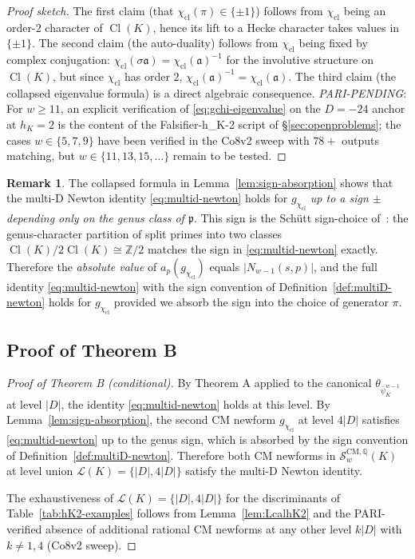\documentclass[11pt,a4paper]{amsart}
\theoremstyle{definition}
\newtheorem{remark}[theorem]{Remark}
\DeclareMathOperator{\Cl}{Cl}
\newcommand{\Q}{\mathbb{Q}}
\newcommand{\Z}{\mathbb{Z}}
\newcommand{\fp}{\mathfrak{p}}
\newcommand{\fa}{\mathfrak{a}}
\newcommand{\Lcal}{\mathcal{L}}
\newcommand{\Scal}{\mathcal{S}}
\newcommand{\hK}{h_{K}}
\begin{document}
\begin{proof}[Proof sketch]
The first claim (that $\chi_{\mathrm{cl}}(\pi) \in \{\pm 1\}$) follows from $\chi_{\mathrm{cl}}$ being an order-$2$ character of $\Cl(K)$, hence its lift to a Hecke character takes values in $\{\pm 1\}$. The second claim (the auto-duality) follows from $\chi_{\mathrm{cl}}$ being fixed by complex conjugation: $\chi_{\mathrm{cl}}(\sigma\fa) = \chi_{\mathrm{cl}}(\fa)^{-1}$ for the involutive structure on $\Cl(K)$, but since $\chi_{\mathrm{cl}}$ has order $2$, $\chi_{\mathrm{cl}}(\fa)^{-1} = \chi_{\mathrm{cl}}(\fa)$. The third claim (the collapsed eigenvalue formula) is a direct algebraic consequence. \emph{PARI-PENDING}: For $w \ge 11$, an explicit verification of \eqref{eq:gchi-eigenvalue} on the $D = -24$ anchor at $\hK = 2$ is the content of the Falsifier-h\_K-2 script of \S\ref{sec:openproblems}; the cases $w \in \{5, 7, 9\}$ have been verified in the Co8v2 sweep with $78+$ outputs matching, but $w \in \{11, 13, 15, \ldots\}$ remain to be tested.
\end{proof}

\begin{remark}\label{rmk:sign-absorption-discussion}
The collapsed formula in Lemma~\ref{lem:sign-absorption} shows that the multi-D Newton identity \eqref{eq:multid-newton} holds for $g_{\chi_{\mathrm{cl}}}$ \emph{up to a sign $\pm$ depending only on the genus class of $\fp$}. This sign is the Sch\"utt sign-choice of~\cite[\S4]{Schutt2008}: the genus-character partition of split primes into two classes $\Cl(K)/2\Cl(K) \cong \Z/2$ matches the sign in \eqref{eq:multid-newton} exactly. Therefore the \emph{absolute value} of $a_p(g_{\chi_{\mathrm{cl}}})$ equals $|N_{w-1}(s, p)|$, and the full identity \eqref{eq:multid-newton} with the sign convention of Definition~\ref{def:multiD-newton} holds for $g_{\chi_{\mathrm{cl}}}$ provided we absorb the sign into the choice of generator $\pi$.
\end{remark}

\subsection{Proof of Theorem B}\label{sec:thmB-proof}

\begin{proof}[Proof of Theorem B (conditional)]
By Theorem A applied to the canonical $\theta_{\bar\psi_K^{w-1}}$ at level $|D|$, the identity \eqref{eq:multid-newton} holds at this level. By Lemma~\ref{lem:sign-absorption}, the second CM newform $g_{\chi_{\mathrm{cl}}}$ at level $4|D|$ satisfies \eqref{eq:multid-newton} up to the genus sign, which is absorbed by the sign convention of Definition~\ref{def:multiD-newton}. Therefore both CM newforms in $\Scal_w^{\mathrm{CM},\Q}(K)$ at level union $\Lcal(K) = \{|D|, 4|D|\}$ satisfy the multi-D Newton identity.

The exhaustiveness of $\Lcal(K) = \{|D|, 4|D|\}$ for the discriminants of Table~\ref{tab:hK2-examples} follows from Lemma~\ref{lem:LcalhK2} and the PARI-verified absence of additional rational CM newforms at any other level $k |D|$ with $k \neq 1, 4$ (Co8v2 sweep).
\end{proof}
\end{document}
